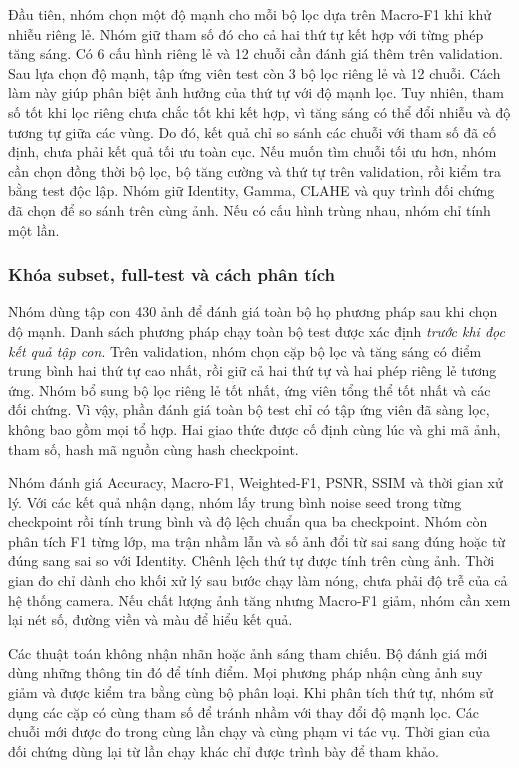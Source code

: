 Đầu tiên, nhóm chọn một độ mạnh cho mỗi bộ lọc dựa trên Macro-F1 khi khử nhiễu riêng lẻ. Nhóm giữ tham số đó cho cả hai thứ tự kết hợp với từng phép tăng sáng. Có 6 cấu hình riêng lẻ và 12 chuỗi cần đánh giá thêm trên validation. Sau lựa chọn độ mạnh, tập ứng viên test còn 3 bộ lọc riêng lẻ và 12 chuỗi. Cách làm này giúp phân biệt ảnh hưởng của thứ tự với độ mạnh lọc. Tuy nhiên, tham số tốt khi lọc riêng chưa chắc tốt khi kết hợp, vì tăng sáng có thể đổi nhiễu và độ tương tự giữa các vùng. Do đó, kết quả chỉ so sánh các chuỗi với tham số đã cố định, chưa phải kết quả tối ưu toàn cục. Nếu muốn tìm chuỗi tối ưu hơn, nhóm cần chọn đồng thời bộ lọc, bộ tăng cường và thứ tự trên validation, rồi kiểm tra bằng test độc lập. Nhóm giữ Identity, Gamma, CLAHE và quy trình đối chứng đã chọn để so sánh trên cùng ảnh. Nếu có cấu hình trùng nhau, nhóm chỉ tính một lần.

\subsubsection{Khóa subset, full-test và cách phân tích}
Nhóm dùng tập con 430 ảnh để đánh giá toàn bộ họ phương pháp sau khi chọn độ mạnh. Danh sách phương pháp chạy toàn bộ test được xác định \textit{trước khi đọc kết quả tập con}. Trên validation, nhóm chọn cặp bộ lọc và tăng sáng có điểm trung bình hai thứ tự cao nhất, rồi giữ cả hai thứ tự và hai phép riêng lẻ tương ứng. Nhóm bổ sung bộ lọc riêng lẻ tốt nhất, ứng viên tổng thể tốt nhất và các đối chứng. Vì vậy, phần đánh giá toàn bộ test chỉ có tập ứng viên đã sàng lọc, không bao gồm mọi tổ hợp. Hai giao thức được cố định cùng lúc và ghi mã ảnh, tham số, hash mã nguồn cùng hash checkpoint.

Nhóm đánh giá Accuracy, Macro-F1, Weighted-F1, PSNR, SSIM và thời gian xử lý. Với các kết quả nhận dạng, nhóm lấy trung bình noise seed trong từng checkpoint rồi tính trung bình và độ lệch chuẩn qua ba checkpoint. Nhóm còn phân tích F1 từng lớp, ma trận nhầm lẫn và số ảnh đổi từ sai sang đúng hoặc từ đúng sang sai so với Identity. Chênh lệch thứ tự được tính trên cùng ảnh. Thời gian đo chỉ dành cho khối xử lý sau bước chạy làm nóng, chưa phải độ trễ của cả hệ thống camera. Nếu chất lượng ảnh tăng nhưng Macro-F1 giảm, nhóm cần xem lại nét số, đường viền và màu để hiểu kết quả.

Các thuật toán không nhận nhãn hoặc ảnh sáng tham chiếu. Bộ đánh giá mới dùng những thông tin đó để tính điểm. Mọi phương pháp nhận cùng ảnh suy giảm và được kiểm tra bằng cùng bộ phân loại. Khi phân tích thứ tự, nhóm sử dụng các cặp có cùng tham số để tránh nhầm với thay đổi độ mạnh lọc. Các chuỗi mới được đo trong cùng lần chạy và cùng phạm vi tác vụ. Thời gian của đối chứng dùng lại từ lần chạy khác chỉ được trình bày để tham khảo.

